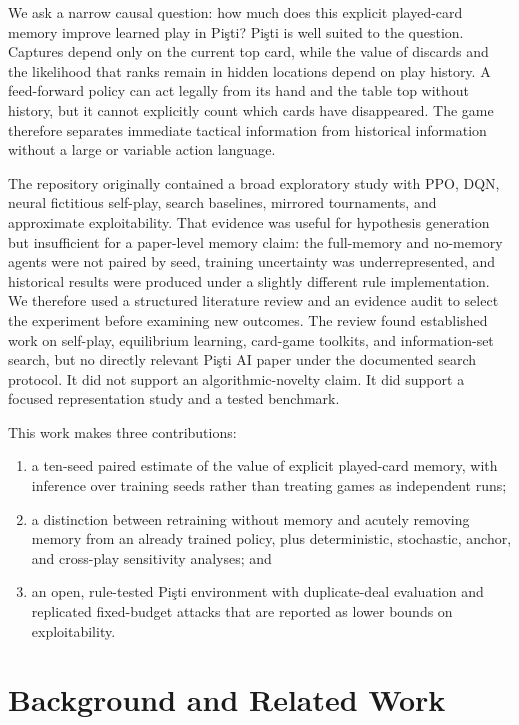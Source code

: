 \documentclass[10pt]{article}
\newcommand{\pisti}{Pişti}
\begin{document}
We ask a narrow causal question: how much does this explicit played-card memory improve learned play in \pisti? \pisti{} is well suited to the question. Captures depend only on the current top card, while the value of discards and the likelihood that ranks remain in hidden locations depend on play history. A feed-forward policy can act legally from its hand and the table top without history, but it cannot explicitly count which cards have disappeared. The game therefore separates immediate tactical information from historical information without a large or variable action language.

The repository originally contained a broad exploratory study with PPO, DQN, neural fictitious self-play, search baselines, mirrored tournaments, and approximate exploitability. That evidence was useful for hypothesis generation but insufficient for a paper-level memory claim: the full-memory and no-memory agents were not paired by seed, training uncertainty was underrepresented, and historical results were produced under a slightly different rule implementation. We therefore used a structured literature review and an evidence audit to select the experiment before examining new outcomes. The review found established work on self-play, equilibrium learning, card-game toolkits, and information-set search, but no directly relevant \pisti{} AI paper under the documented search protocol. It did not support an algorithmic-novelty claim. It did support a focused representation study and a tested benchmark.

This work makes three contributions:
\begin{enumerate}
    \item a ten-seed paired estimate of the value of explicit played-card memory, with inference over training seeds rather than treating games as independent runs;
    \item a distinction between retraining without memory and acutely removing memory from an already trained policy, plus deterministic, stochastic, anchor, and cross-play sensitivity analyses; and
    \item an open, rule-tested \pisti{} environment with duplicate-deal evaluation and replicated fixed-budget attacks that are reported as lower bounds on exploitability.
\end{enumerate}

\section{Background and Related Work}
\end{document}
